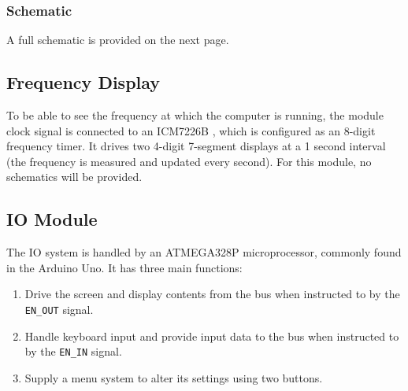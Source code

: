 \subsubsection{Schematic}
A full schematic is provided on the next page.



\subsection{Frequency Display}
To be able to see the frequency at which the computer is running, the module clock signal is connected to an ICM7226B \cite{?}, which is configured as an 8-digit frequency timer. It drives two 4-digit 7-segment displays at a 1 second interval (the frequency is measured and updated every second). For this module, no schematics will be provided.

\subsection{IO Module}
The IO system is handled by an ATMEGA328P microprocessor, commonly found in the Arduino Uno. It has three main functions:
\begin{enumerate}
\item Drive the screen and display contents from the bus when instructed to by the \texttt{EN\_OUT} signal.
\item Handle keyboard input and provide input data to the bus when instructed to by the \texttt{EN\_IN} signal.
\item Supply a menu system to alter its settings using two buttons.
\end{enumerate}

